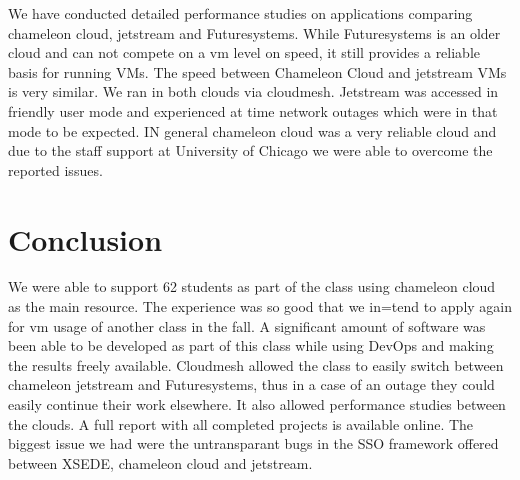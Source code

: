 \documentclass[sigconf]{acmart}
\begin{document}
We have conducted detailed performance studies on applications
comparing chameleon cloud, jetstream and Futuresystems. While
Futuresystems is an older cloud and can not compete on a vm level on
speed, it still provides a reliable basis for running VMs. The speed
between Chameleon Cloud and jetstream VMs is very similar. We ran in
both clouds via cloudmesh. Jetstream was accessed in friendly user
mode and experienced at time network outages which were in that mode
to be expected. IN general chameleon cloud was a very reliable cloud
and due to the staff support at University of Chicago we were able to
overcome the reported issues.

\section{Conclusion}

We were able to support 62 students as part of the class using
chameleon cloud as the main resource. The experience was so good that
we in=tend to apply again for vm usage of another class in the fall. A
significant amount of software was been able to be developed as part
of this class while using DevOps and making the results freely
available. Cloudmesh allowed the class to easily switch between
chameleon jetstream and Futuresystems, thus in a case of an outage
they could easily continue their work elsewhere. It also allowed
performance studies between the clouds. A full report with all
completed projects is available online. The biggest issue we had were
the untransparant bugs in the SSO framework offered between XSEDE,
chameleon cloud and jetstream.



 
\end{document}
